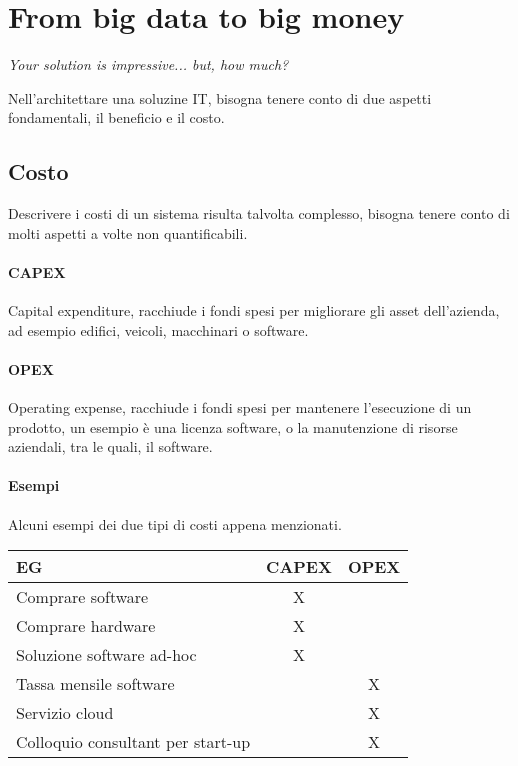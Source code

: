 \section{From big data to big money}
\begin{center}
    \emph{Your solution is impressive... but, how much?}
\end{center}
Nell'architettare una soluzine IT, bisogna tenere conto di due 
aspetti fondamentali, il beneficio e il costo.

\subsection{Costo}
Descrivere i costi di un sistema risulta talvolta complesso, 
bisogna tenere conto di molti aspetti a volte non quantificabili.

\paragraph{CAPEX}
Capital expenditure, racchiude i fondi spesi per migliorare gli asset dell'azienda, 
ad esempio edifici, veicoli, macchinari o software.

\paragraph{OPEX}
Operating expense, racchiude i fondi spesi per mantenere l'esecuzione di un prodotto, 
un esempio è una licenza software, o la manutenzione di risorse aziendali, tra 
le quali, il software.

\paragraph{Esempi}
Alcuni esempi dei due tipi di costi appena menzionati.
\begin{center}
    \begin{tabular}{lcc} 
    \toprule
        EG & CAPEX & OPEX \\
    \midrule
        Comprare software & X &  \\ 
        Comprare hardware & X &  \\
        Soluzione software ad-hoc  & X &  \\
        Tassa mensile software &   & X \\
        Servizio cloud &   & X \\
        Colloquio consultant per start-up &   & X \\
    \bottomrule
   \end{tabular}
\end{center}

